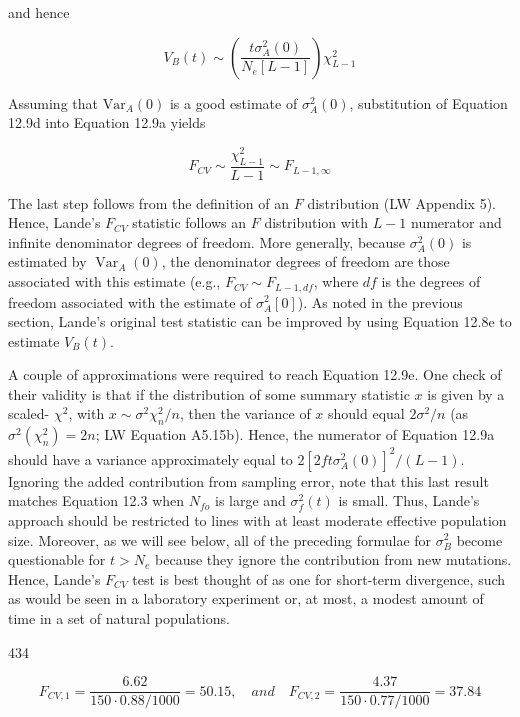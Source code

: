 \documentclass{article}
\begin{document}
and hence

\begin{equation}
V_{B}(t)\sim\left(\frac{t\sigma_{A}^{2}(0)}{N_{e}[L-1]}\right)\chi_{L-1}^{2}
\tag{12.9d}
\label{eq:12_9d}
\end{equation}

Assuming that  $ \mathrm{Var}_{A}(0) $ is a good estimate of  $ \sigma_{A}^{2}(0) $, substitution of Equation 12.9d into Equation 12.9a yields

\begin{equation}
F_{CV}\sim\frac{\chi^{2}_{L-1}}{L-1}\sim F_{L-1,\infty}
\tag{12.9e}
\label{eq:12_9e}
\end{equation}

The last step follows from the definition of an $F$ distribution (LW Appendix 5). Hence, Lande's $F_{CV}$ statistic follows an $F$ distribution with $L - 1$ numerator and infinite denominator degrees of freedom. More generally, because $\sigma_A^2(0)$ is estimated by $\operatorname{Var}_A(0)$, the denominator degrees of freedom are those associated with this estimate (e.g., $F_{CV} \sim F_{L-1,df}$, where $df$ is the degrees of freedom associated with the estimate of $\sigma_A^2[0]$). As noted in the previous section, Lande's original test statistic can be improved by using Equation 12.8e to estimate $V_B(t)$.

A couple of approximations were required to reach Equation 12.9e. One check of their validity is that if the distribution of some summary statistic  $ x $ is given by a scaled- $ \chi^2 $, with  $ x \sim \sigma^2 \chi_n^2 / n $, then the variance of  $ x $ should equal  $ 2\sigma^2 / n $ (as  $ \sigma^2(\chi_n^2) = 2n $; LW Equation A5.15b). Hence, the numerator of Equation 12.9a should have a variance approximately equal to  $ 2[2ft\sigma_A^2(0)]^2 / (L - 1) $. Ignoring the added contribution from sampling error, note that this last result matches Equation 12.3 when  $ N_{fo} $ is large and  $ \sigma_f^2(t) $ is small. Thus, Lande's approach should be restricted to lines with at least moderate effective population size. Moreover, as we will see below, all of the preceding formulae for  $ \sigma_B^2 $ become questionable for  $ t > N_e $ because they ignore the contribution from new mutations. Hence, Lande's  $ F_{CV} $ test is best thought of as one for short-term divergence, such as would be seen in a laboratory experiment or, at most, a modest amount of time in a set of natural populations.

434

\begin{equation}
F_{CV,1}=\frac{6.62}{150\cdot0.88/1000}=50.15,\quad and\quad F_{CV,2}=\frac{4.37}{150\cdot0.77/1000}=37.84
\end{equation}
\end{document}
